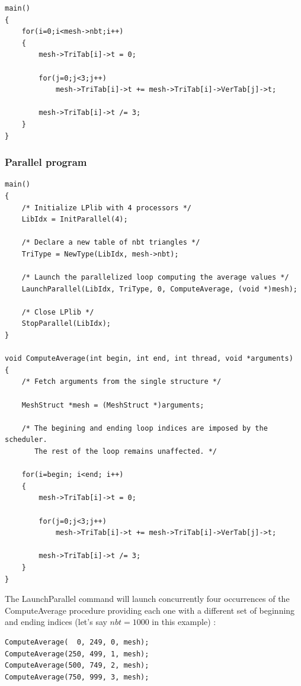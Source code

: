 \documentclass[a4paper,12pt]{article}
\begin{document}
\begin{tt}
\begin{verbatim}
main()
{
    for(i=0;i<mesh->nbt;i++)
    {
        mesh->TriTab[i]->t = 0;

        for(j=0;j<3;j++)
            mesh->TriTab[i]->t += mesh->TriTab[i]->VerTab[j]->t;

        mesh->TriTab[i]->t /= 3;
    }
}
\end{verbatim}
\end{tt}
\normalfont

\subsubsection{Parallel program}

\begin{tt}
\begin{verbatim}
main()
{
    /* Initialize LPlib with 4 processors */
    LibIdx = InitParallel(4);

    /* Declare a new table of nbt triangles */
    TriType = NewType(LibIdx, mesh->nbt);

    /* Launch the parallelized loop computing the average values */
    LaunchParallel(LibIdx, TriType, 0, ComputeAverage, (void *)mesh);

    /* Close LPlib */
    StopParallel(LibIdx);
}

void ComputeAverage(int begin, int end, int thread, void *arguments)
{
    /* Fetch arguments from the single structure */

    MeshStruct *mesh = (MeshStruct *)arguments;

    /* The begining and ending loop indices are imposed by the scheduler.
       The rest of the loop remains unaffected. */

    for(i=begin; i<end; i++)
    {
        mesh->TriTab[i]->t = 0;

        for(j=0;j<3;j++)
            mesh->TriTab[i]->t += mesh->TriTab[i]->VerTab[j]->t;

        mesh->TriTab[i]->t /= 3;
    }
}
\end{verbatim}
\end{tt}
\normalfont

The LaunchParallel command will launch concurrently four occurrences of the ComputeAverage procedure providing each one with a different set of beginning and ending indices (let's say $nbt = 1000$ in this example) :

\begin{tt}
\begin{verbatim}
ComputeAverage(  0, 249, 0, mesh);
ComputeAverage(250, 499, 1, mesh);
ComputeAverage(500, 749, 2, mesh);
ComputeAverage(750, 999, 3, mesh);
\end{verbatim}
\end{tt}
\normalfont
\end{document}
